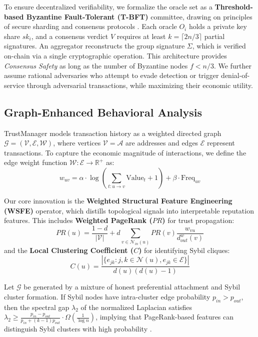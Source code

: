 \documentclass[runningheads]{llncs}
\begin{document}
To ensure decentralized verifiability, we formalize the oracle set as a \textbf{Threshold-based Byzantine Fault-Tolerant (T-BFT)} committee, drawing on principles of secure sharding and consensus protocols \cite{luu2016secure}. Each oracle $O_i$ holds a private key share $sk_i$, and a consensus verdict $V$ requires at least $k = \lceil 2n/3 \rceil$ partial signatures. An aggregator reconstructs the group signature $\Sigma$, which is verified on-chain via a single cryptographic operation. This architecture provides \textit{Consensus Safety} as long as the number of Byzantine nodes $f < n/3$. We further assume rational adversaries who attempt to evade detection or trigger denial-of-service through adversarial transactions, while maximizing their economic utility.

\subsection{Graph-Enhanced Behavioral Analysis}
TrustManager models transaction history as a weighted directed graph $\mathcal{G} = (\mathcal{V}, \mathcal{E}, \mathcal{W})$, where vertices $\mathcal{V} = \mathcal{A}$ are addresses and edges $\mathcal{E}$ represent transactions. To capture the economic magnitude of interactions, we define the edge weight function $\mathcal{W}: \mathcal{E} \rightarrow \mathbb{R}^+$ as:
\begin{equation}
    w_{uv} = \alpha \cdot \log\left(\sum_{t: u\rightarrow v} \text{Value}_t + 1\right) + \beta \cdot \text{Freq}_{uv}
\end{equation}

Our core innovation is the \textbf{Weighted Structural Feature Engineering (WSFE)} operator, which distills topological signals into interpretable reputation features. This includes \textbf{Weighted PageRank ($PR$)} for trust propagation:
\begin{equation}
    PR(u) = \frac{1-d}{|\mathcal{V}|} + d \sum_{v \in \mathcal{N}_{in}(u)} PR(v) \frac{w_{vu}}{d_{out}^w(v)}
\end{equation}
and the \textbf{Local Clustering Coefficient ($C$)} for identifying Sybil cliques:
\begin{equation}
    C(u) = \frac{|\{e_{jk}: j,k \in \mathcal{N}(u), e_{jk} \in \mathcal{E}\}|}{d(u)(d(u)-1)}
\end{equation}

\begin{proposition}
Let $\mathcal{G}$ be generated by a mixture of honest preferential attachment and Sybil cluster formation. If Sybil nodes have intra-cluster edge probability $p_{in} > p_{out}$, then the spectral gap $\lambda_2$ of the normalized Laplacian satisfies $\lambda_2 \geq \frac{p_{in} - p_{out}}{p_{in} + (k-1)p_{out}} \cdot \Omega(\frac{1}{\log n})$, implying that PageRank-based features can distinguish Sybil clusters with high probability \cite{boshmaf2013graph, gong2014sybilbelief}.
\end{proposition}
\end{document}
